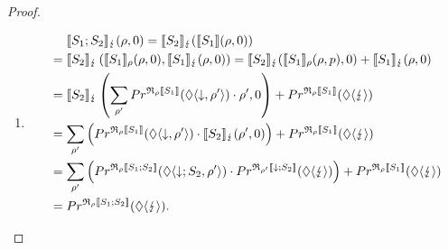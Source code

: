 \documentclass[a4paper,UKenglish,cleveref, autoref, thm-restate]{lipics-v2021}
\begin{document}
\begin{proof}
\begin{enumerate}
\begin{itemize}
\begin{enumerate}
        \item \begin{align*}
            &\phantom{=.}\llbracket S_1;S_2 \rrbracket_{\lightning}(\rho,0) = \llbracket S_2 \rrbracket_{\lightning}(\llbracket S_1 \rrbracket (\rho,0 )) \\
            &= \llbracket S_2 \rrbracket_{\lightning}\left(\llbracket S_1 \rrbracket_{\rho} (\rho,0 ),\llbracket S_1 \rrbracket_{\lightning}(\rho,0)\right)= \llbracket S_2 \rrbracket_{\lightning}(\llbracket S_1 \rrbracket_{\rho} (\rho,p ),0)+ \llbracket S_1 \rrbracket_{\lightning}(\rho,0)\\
            &= \llbracket S_2 \rrbracket_{\lightning}\left(\sum_{\rho'} Pr^{\mathfrak{R}_{\rho}\llbracket S_1 \rrbracket}(\lozenge \langle \downarrow , \rho' \rangle) \cdot \rho' ,0\right)+ Pr^{\mathfrak{R}_{\rho}\llbracket S_1 \rrbracket}(\lozenge \langle \lightning \rangle)\\
            &= \sum_{\rho'} \left(Pr^{\mathfrak{R}_{\rho}\llbracket S_1 \rrbracket}(\lozenge \langle \downarrow , \rho' \rangle) \cdot \llbracket S_2 \rrbracket_{\lightning}(\rho',0) \right)+ Pr^{\mathfrak{R}_{\rho}\llbracket S_1 \rrbracket}(\lozenge \langle \lightning \rangle)\\
            &= \sum_{\rho'} \left(Pr^{\mathfrak{R}_{\rho}\llbracket S_1;S_2 \rrbracket}(\lozenge \langle \downarrow;S_2 , \rho' \rangle) \cdot Pr^{\mathfrak{R}_{\rho'}\llbracket \downarrow;S_2 \rrbracket}(\lozenge \langle \lightning \rangle) \right)+ Pr^{\mathfrak{R}_{\rho}\llbracket S_1 \rrbracket}(\lozenge \langle \lightning \rangle)\\
            &=  Pr^{\mathfrak{R}_{\rho}\llbracket S_1;S_2 \rrbracket}(\lozenge \langle \lightning \rangle).
        \end{align*}
        \end{enumerate}



\end{itemize}
\end{enumerate}
\end{proof}
\end{document}
